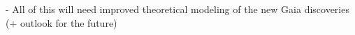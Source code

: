 \documentclass[final,5p,times,twocolumn,authoryear]{elsarticle}
\begin{document}
- All of this will need improved theoretical modeling of the new Gaia discoveries (+ outlook for the future)






\end{document}
